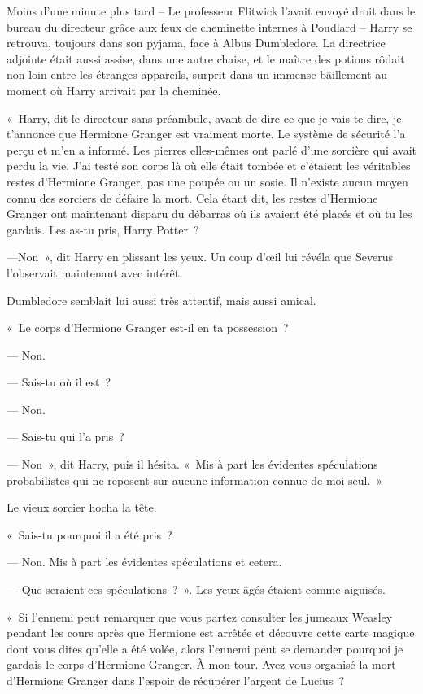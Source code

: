 Moins d'une minute plus tard -- Le professeur Flitwick l'avait envoyé droit dans le bureau du directeur grâce aux feux de cheminette internes à Poudlard -- Harry se retrouva, toujours dans son pyjama, face à Albus Dumbledore. La directrice adjointe était aussi assise, dans une autre chaise, et le maître des potions rôdait non loin entre les étranges appareils, surprit dans un immense bâillement au moment où Harry arrivait par la cheminée.

«~Harry, dit le directeur sans préambule, avant de dire ce que je vais te dire, je t'annonce que Hermione Granger est vraiment morte. Le système de sécurité l'a perçu et m'en a informé. Les pierres elles-mêmes ont parlé d'une sorcière qui avait perdu la vie. J'ai testé son corps là où elle était tombée et c'étaient les véritables restes d'Hermione Granger, pas une poupée ou un sosie. Il n'existe aucun moyen connu des sorciers de défaire la mort. Cela étant dit, les restes d'Hermione Granger ont maintenant disparu du débarras où ils avaient été placés et où tu les gardais. Les as-tu pris, Harry Potter~?

---Non~», dit Harry en plissant les yeux. Un coup d'œil lui révéla que Severus l'observait maintenant avec intérêt.

Dumbledore semblait lui aussi très attentif, mais aussi amical.

«~Le corps d'Hermione Granger est-il en ta possession~?

--- Non.

--- Sais-tu où il est~?

--- Non.

--- Sais-tu qui l'a pris~?

--- Non~», dit Harry, puis il hésita. «~Mis à part les évidentes spéculations probabilistes qui ne reposent sur aucune information connue de moi seul.~»

Le vieux sorcier hocha la tête.

«~Sais-tu pourquoi il a été pris~?

--- Non. Mis à part les évidentes spéculations et cetera.

--- Que seraient ces spéculations~?~». Les yeux âgés étaient comme aiguisés.

«~Si l'ennemi peut remarquer que vous partez consulter les jumeaux Weasley pendant les cours après que Hermione est arrêtée et découvre cette carte magique dont vous dites qu'elle a été volée, alors l'ennemi peut se demander pourquoi je gardais le corps d'Hermione Granger. À mon tour. Avez-vous organisé la mort d'Hermione Granger dans l'espoir de récupérer l'argent de Lucius~?

